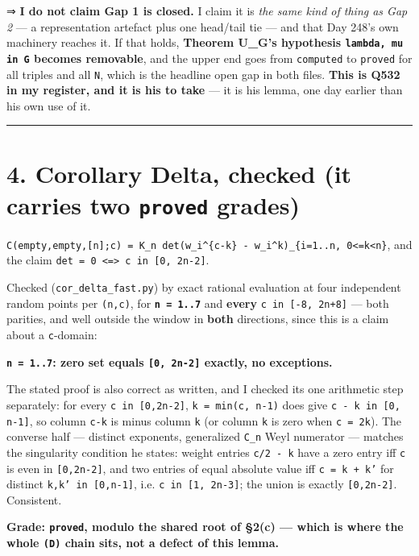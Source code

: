 \documentclass[11pt,a4paper]{article}
\begin{document}
⇒ \textbf{I do not claim Gap 1 is closed.} I claim it is \emph{the same kind of thing as Gap 2} --- a representation artefact plus one head/tail tie --- and that Day 248's own machinery reaches it. If that holds, \textbf{Theorem U\_G's hypothesis \mbox{\texttt{lambda, mu in G}} becomes removable}, and the upper end goes from \mbox{\texttt{computed}} to \mbox{\texttt{proved}} for all triples and all \mbox{\texttt{N}}, which is the headline open gap in both files. \textbf{This is Q532 in my register, and it is his to take} --- it is his lemma, one day earlier than his own use of it.

\medskip\hrule\medskip

\section*{4. Corollary Delta, checked (it carries two \mbox{\texttt{proved}} grades)}

\mbox{\texttt{C(empty,empty,[n];c) = K\_n det(w\_i\textasciicircum{}\{c-k\} - w\_i\textasciicircum{}k)\_\{i=1..n, 0<=k<n\}}}, and the claim \mbox{\texttt{det = 0 <=> c in [0, 2n-2]}}.

Checked (\mbox{\texttt{cor\_delta\_fast.py}}) by exact rational evaluation at four independent random points per \mbox{\texttt{(n,c)}}, for \textbf{\mbox{\texttt{n = 1..7}}} and \textbf{every} \mbox{\texttt{c in [-8, 2n+8]}} --- both parities, and well outside the window in \textbf{both} directions, since this is a claim about a \mbox{\texttt{c}}-domain:

\textbf{\mbox{\texttt{n = 1..7}}: zero set equals \mbox{\texttt{[0, 2n-2]}} exactly, no exceptions.}

The stated proof is also correct as written, and I checked its one arithmetic step separately: for every \mbox{\texttt{c in [0,2n-2]}}, \mbox{\texttt{k = min(c, n-1)}} does give \mbox{\texttt{c - k in [0, n-1]}}, so column \mbox{\texttt{c-k}} is minus column \mbox{\texttt{k}} (or column \mbox{\texttt{k}} is zero when \mbox{\texttt{c = 2k}}). The converse half --- distinct exponents, generalized \mbox{\texttt{C\_n}} Weyl numerator --- matches the singularity condition he states: weight entries \mbox{\texttt{c/2 - k}} have a zero entry iff \mbox{\texttt{c}} is even in \mbox{\texttt{[0,2n-2]}}, and two entries of equal absolute value iff \mbox{\texttt{c = k + k'}} for distinct \mbox{\texttt{k,k' in [0,n-1]}}, i.e. \mbox{\texttt{c in [1, 2n-3]}}; the union is exactly \mbox{\texttt{[0,2n-2]}}. Consistent.

\textbf{Grade: \mbox{\texttt{proved}}, modulo the shared root of \S{}2(c) --- which is where the whole \mbox{\texttt{(D)}} chain sits, not a defect of this lemma.}
\end{document}
